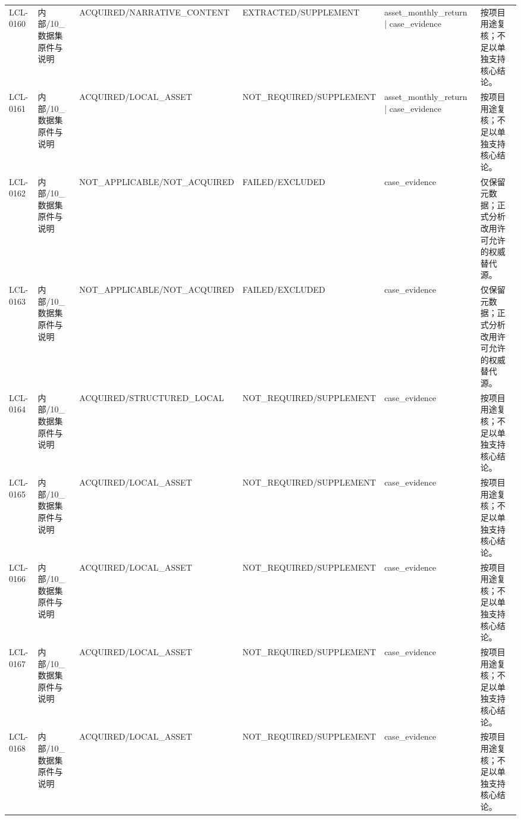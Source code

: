 \begin{landscape}
\begin{longtable}{p{1.8cm}p{2.6cm}p{2.6cm}p{2.6cm}p{4.8cm}p{7.2cm}}
LCL-0160 & 内部/\allowbreak{}10\_\allowbreak{}数据集原件与说明 & ACQUIRED/\allowbreak{}NARRATIVE\_\allowbreak{}CONTENT & EXTRACTED/\allowbreak{}SUPPLEMENT & asset\_\allowbreak{}monthly\_\allowbreak{}return | case\_\allowbreak{}evidence & 按项目用途复核；不足以单独支持核心结论。\\
LCL-0161 & 内部/\allowbreak{}10\_\allowbreak{}数据集原件与说明 & ACQUIRED/\allowbreak{}LOCAL\_\allowbreak{}ASSET & NOT\_\allowbreak{}REQUIRED/\allowbreak{}SUPPLEMENT & asset\_\allowbreak{}monthly\_\allowbreak{}return | case\_\allowbreak{}evidence & 按项目用途复核；不足以单独支持核心结论。\\
LCL-0162 & 内部/\allowbreak{}10\_\allowbreak{}数据集原件与说明 & NOT\_\allowbreak{}APPLICABLE/\allowbreak{}NOT\_\allowbreak{}ACQUIRED & FAILED/\allowbreak{}EXCLUDED & case\_\allowbreak{}evidence & 仅保留元数据；正式分析改用许可允许的权威替代源。\\
LCL-0163 & 内部/\allowbreak{}10\_\allowbreak{}数据集原件与说明 & NOT\_\allowbreak{}APPLICABLE/\allowbreak{}NOT\_\allowbreak{}ACQUIRED & FAILED/\allowbreak{}EXCLUDED & case\_\allowbreak{}evidence & 仅保留元数据；正式分析改用许可允许的权威替代源。\\
LCL-0164 & 内部/\allowbreak{}10\_\allowbreak{}数据集原件与说明 & ACQUIRED/\allowbreak{}STRUCTURED\_\allowbreak{}LOCAL & NOT\_\allowbreak{}REQUIRED/\allowbreak{}SUPPLEMENT & case\_\allowbreak{}evidence & 按项目用途复核；不足以单独支持核心结论。\\
LCL-0165 & 内部/\allowbreak{}10\_\allowbreak{}数据集原件与说明 & ACQUIRED/\allowbreak{}LOCAL\_\allowbreak{}ASSET & NOT\_\allowbreak{}REQUIRED/\allowbreak{}SUPPLEMENT & case\_\allowbreak{}evidence & 按项目用途复核；不足以单独支持核心结论。\\
LCL-0166 & 内部/\allowbreak{}10\_\allowbreak{}数据集原件与说明 & ACQUIRED/\allowbreak{}LOCAL\_\allowbreak{}ASSET & NOT\_\allowbreak{}REQUIRED/\allowbreak{}SUPPLEMENT & case\_\allowbreak{}evidence & 按项目用途复核；不足以单独支持核心结论。\\
LCL-0167 & 内部/\allowbreak{}10\_\allowbreak{}数据集原件与说明 & ACQUIRED/\allowbreak{}LOCAL\_\allowbreak{}ASSET & NOT\_\allowbreak{}REQUIRED/\allowbreak{}SUPPLEMENT & case\_\allowbreak{}evidence & 按项目用途复核；不足以单独支持核心结论。\\
LCL-0168 & 内部/\allowbreak{}10\_\allowbreak{}数据集原件与说明 & ACQUIRED/\allowbreak{}LOCAL\_\allowbreak{}ASSET & NOT\_\allowbreak{}REQUIRED/\allowbreak{}SUPPLEMENT & case\_\allowbreak{}evidence & 按项目用途复核；不足以单独支持核心结论。\\

\end{longtable}
\end{landscape}
